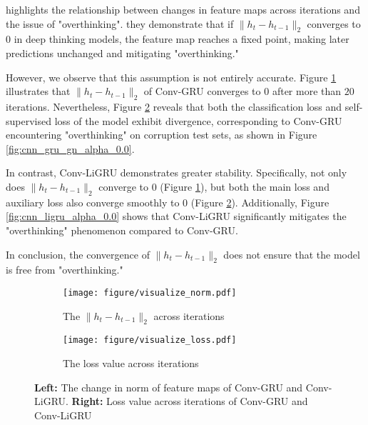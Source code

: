 \cite{bansal2022endtoend} highlights the relationship between changes in feature maps across iterations and the issue of "overthinking".
they demonstrate that if \(\|h_t-h_{t-1}\|_2\) converges to $0$ in deep thinking models, the feature map reaches a fixed point, making later predictions unchanged and mitigating "overthinking."

However, we observe that this assumption is not entirely accurate. Figure \ref{fig:visualize norm} illustrates that $\|h_t - h_{t-1}\|_2$ of Conv-GRU converges to $0$ after more than $20$ iterations. 
Nevertheless, Figure \ref{fig:visualize loss} reveals that both the classification loss and self-supervised loss of the model exhibit divergence, corresponding to Conv-GRU encountering "overthinking" on corruption test sets, as shown in Figure \ref{fig:cnn_gru_gn_alpha_0.0}. 

In contrast, Conv-LiGRU demonstrates greater stability. Specifically, not only does $\|h_t - h_{t-1}\|_2$ converge to $0$ (Figure \ref{fig:visualize norm}), but both the main loss and auxiliary loss also converge smoothly to $0$ (Figure \ref{fig:visualize loss}). Additionally, Figure \ref{fig:cnn_ligru_alpha_0.0} shows that Conv-LiGRU significantly mitigates the "overthinking" phenomenon compared to Conv-GRU. 

In conclusion, the convergence of $\|h_t - h_{t-1}\|_2$ does not ensure that the model is free from "overthinking."

\begin{figure}[t!]
    \centering
    \begin{subfigure}{0.3\textwidth}
        \texttt{[image: figure/visualize\_norm.pdf]}
        \caption{The $\|h_t - h_{t-1}\|_2$ across iterations}
        \label{fig:visualize norm}
    \end{subfigure}
    \vfill
    \begin{subfigure}{0.45\textwidth}
        \texttt{[image: figure/visualize\_loss.pdf]}
        \caption{The loss value across iterations}
        \label{fig:visualize loss}
    \end{subfigure}
    \caption{\textbf{Left:} The change in norm of feature maps of Conv-GRU and Conv-LiGRU. \textbf{Right:} Loss value across iterations of Conv-GRU and Conv-LiGRU}
    \label{fig:layer_norm}
\end{figure}
